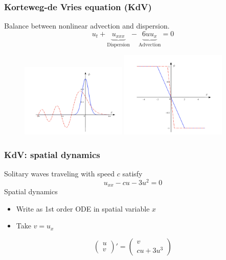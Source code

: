 \documentclass[16pt]{beamer}
\begin{document}
\begin{frame}
\frametitle{Korteweg-de Vries equation (KdV)}
\fontsize{16}{7.2}\selectfont
Balance between nonlinear advection and dispersion.
\[
u_t + \underbrace{u_{xxx}}_{\text{Dispersion}} - \underbrace{6 u u_x}_{\text{Advection}} 
= 0
\]
\begin{figure}[H]
\includegraphics[width=0.45\textwidth]{images/dispersion.png}
\includegraphics[width=0.45\textwidth]{images/nladvection.png}
\end{figure}
\end{frame}

\begin{frame}
\frametitle{KdV: spatial dynamics}
\fontsize{16}{7.2}\selectfont
Solitary waves traveling with speed $c$ satisfy
\[
u_{xx} - c u - 3 u^2 = 0
\]
Spatial dynamics
\begin{itemize}
	\item Write as 1st order ODE in spatial variable $x$ 
	\item Take $v = u_x$
\end{itemize}
\[
\begin{pmatrix}u \\ v
\end{pmatrix}'
= \begin{pmatrix}
v \\ c u + 3 u^3
\end{pmatrix}
\]
\end{frame}
\end{document}
